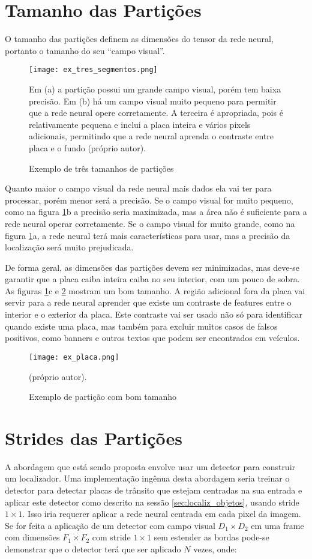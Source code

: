 \section{Tamanho das Partições}
O tamanho das partições definem as dimensões do tensor da rede neural, portanto
o tamanho do seu “campo visual”.


\begin{figure}[!htb]
	\centering
	\texttt{[image: ex\_tres\_segmentos.png]}
	\caption{Exemplo de três tamanhos de partições}
	\label{fig:ex_tres_segmentos}
	Em (a) a partição possui um grande campo visual, porém tem baixa precisão.
	Em (b) há um campo visual muito pequeno para permitir que a rede neural
	opere corretamente. A terceira é apropriada, pois é relativamente pequena e
	inclui a placa inteira e vários pixels adicionais, permitindo que a rede
	neural aprenda o contraste entre placa e o fundo (próprio autor).
\end{figure}

Quanto maior o campo visual da rede neural mais dados ela vai ter para
processar, porém menor será a precisão. Se o campo visual for muito pequeno,
como na figura \ref{fig:ex_tres_segmentos}b a precisão seria maximizada,
mas a área não é suficiente para a rede neural operar corretamente. Se
o campo visual for muito grande, como na figura \ref{fig:ex_tres_segmentos}a,
a rede neural terá mais características para usar, mas a precisão da
localização será muito prejudicada.

De forma geral, as dimensões das partições devem ser minimizadas, mas deve-se
garantir que a placa caiba inteira caiba no seu interior, com um pouco de
sobra. As figuras \ref{fig:ex_tres_segmentos}c e \ref{fig:ex_placa} mostram
um bom tamanho. A região adicional fora da placa vai servir para a rede
neural aprender que existe um contraste de features entre o
interior e o exterior da placa. Este contraste vai ser usado não só para
identificar quando existe uma placa, mas também para excluir muitos casos de
falsos positivos, como banners e outros textos que podem ser encontrados em
veículos.

\begin{figure}[!htb]
	\centering
	\texttt{[image: ex\_placa.png]}
	\caption{Exemplo de partição com bom tamanho}
	\label{fig:ex_placa}
	(próprio autor).
\end{figure}

\section{Strides das Partições}
A abordagem que está sendo proposta envolve usar um detector para construir um
localizador. Uma implementação ingênua desta abordagem seria treinar o detector
para detectar placas de trânsito que estejam centradas na sua entrada e aplicar
este detector como descrito na sessão \ref{sec:localiz_objetos}, usando
stride $1 \times 1$.  Isso iria requerer aplicar a rede neural centrada em
cada pixel da imagem. Se for feita a aplicação de um detector com campo
visual $D_1 \times D_2$ em uma frame com dimensões $F_1 \times F_2$ com stride
$1 \times 1$ sem estender as bordas pode-se demonstrar que o detector terá
que ser aplicado $N$ vezes, onde:

